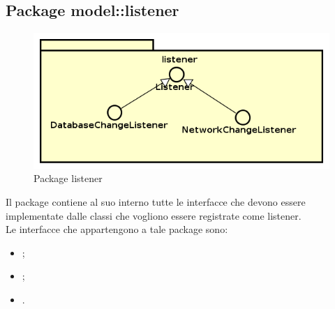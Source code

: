 \documentclass[../Tesi.tex]{subfiles}
\begin{document}
	\subsection{Package model::listener}
		\begin{figure}[H]
			\centering
			\includegraphics[scale=0.6]{images/package_diagrams/listener}
				\caption{Package listener}
			\label{fig:StrutturaMVP}
		\end{figure}
		Il package  contiene al suo interno tutte le interfacce che devono essere implementate dalle classi che vogliono essere registrate come listener. \\
		Le interfacce che appartengono a tale package sono:
		\begin{itemize}
			\item {};
			\item {};
			\item {}.
		\end{itemize}
\end{document}
